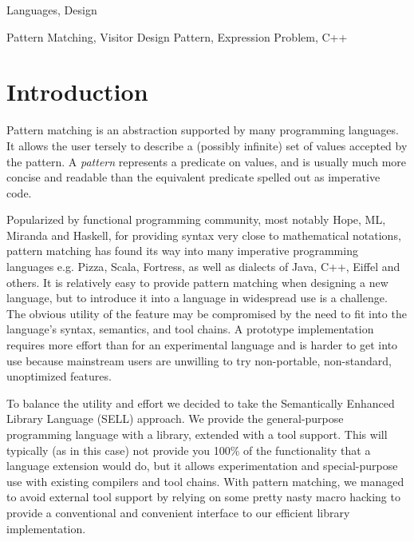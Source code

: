 \documentclass[preprint]{sigplanconf}
\begin{document}

\terms
Languages, Design

\keywords
Pattern Matching, Visitor Design Pattern, Expression Problem, C++

\section{Introduction} %
\label{sec:intro}


Pattern matching is an abstraction supported by many programming languages.
It allows the user tersely to describe a (possibly infinite) set of 
values accepted by the pattern. A \emph{pattern} represents a predicate on 
values, and is usually  much more concise and readable than the 
equivalent predicate spelled out as imperative code.

Popularized by functional programming community, most notably Hope\cite{BMS80}, 
ML\cite{ML90}, Miranda\cite{Miranda85} and Haskell\cite{Haskell98Book}, for 
providing syntax very close to mathematical notations, pattern matching has 
found its way into many imperative programming languages e.g. 
Pizza\cite{Odersky97pizzainto}, Scala\cite{Scala2nd}, Fortress\cite{RPS10}, as 
well as dialects of Java\cite{Liu03jmatch:iterable,HydroJ2003}, C++\cite{Prop96}, 
Eiffel\cite{Moreau:2003} and others. It is relatively easy to provide pattern 
matching when designing a new language, but to introduce it into a language in 
widespread use is a challenge. The obvious utility of the feature may be 
compromised by the need to fit into the language's syntax, semantics, and tool 
chains. A prototype implementation requires more effort than for an experimental 
language and is harder to get into use because mainstream users are unwilling 
to try non-portable, non-standard, unoptimized features.

To balance the utility and effort we decided to take the Semantically 
Enhanced Library Language (SELL) approach\cite{SELL}. We provide the
general-purpose programming language with a library, extended with a tool 
support. This will typically (as in this case) not provide you 100\% of the functionality that a 
language extension would do, but it allows experimentation and special-purpose use
with existing compilers and tool chains. With pattern matching, we managed to avoid 
external tool support by relying on some pretty nasty macro hacking to provide a
conventional and convenient interface to our efficient library implementation.
\end{document}
